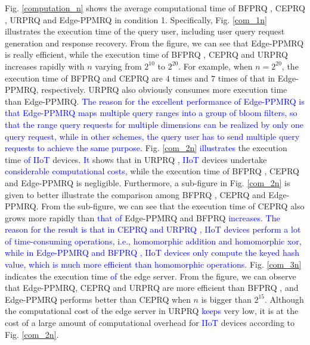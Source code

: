 \documentclass[IEEE JOURNAL OF BIOMEDICAL AND HEALTH INFORMATICS]{IEEEtran}
\begin{document}
{Fig. \ref{computation_n} shows the average computational time of BFPRQ \cite{mahdikhani2020IoT}, CEPRQ \cite{hasan2020IoT}, URPRQ \cite{mahdikhani2020using} and Edge-PPMRQ in condition 1. Specifically, Fig. \ref{com_1n} illustrates the execution time of the query user, including user query request generation and response recovery. From the figure, we can see that Edge-PPMRQ is really efficient, while the execution time of BFPRQ \cite{mahdikhani2020IoT}, CEPRQ \cite{hasan2020IoT} and URPRQ \cite{mahdikhani2020using} increases rapidly with $n$ varying from $2^{10}$ to $2^{20}$. For example, when $n=2^{20}$, the execution time of BFPRQ \cite{mahdikhani2020IoT} and CEPRQ \cite{hasan2020IoT} are $4$ times and $7$ times of that in Edge-PPMRQ, respectively. URPRQ \cite{mahdikhani2020using} also obviously consumes more execution time than Edge-PPMRQ. \textcolor{blue}{The reason for the excellent performance of Edge-PPMRQ is that Edge-PPMRQ maps multiple query ranges into a \textcolor{blue}{group of bloom filters}, so that the range query requests for multiple dimensions can be realized by only one query request, while in other schemes, the query user has to send multiple query requests to achieve the same purpose}. Fig. \ref{com_2n} \textcolor{blue}{illustrates} the execution time \textcolor{blue}{of} \textcolor{blue}{IIoT} devices. \textcolor{blue}{It} shows that in URPRQ \cite{mahdikhani2020using}, \textcolor{blue}{IIoT} devices undertake \textcolor{blue}{considerable computational costs}, while the execution time of BFPRQ \cite{mahdikhani2020IoT}, CEPRQ \cite{hasan2020IoT} and Edge-PPMRQ is negligible. Furthermore, a sub-figure in Fig. \ref{com_2n} is given to better illustrate the comparison among BFPRQ \cite{mahdikhani2020IoT}, CEPRQ \cite{hasan2020IoT} and Edge-PPMRQ. From the sub-figure, we can see that the execution time of CEPRQ \cite{hasan2020IoT} also grows more rapidly than \textcolor{blue}{that of} Edge-PPMRQ and BFPRQ \cite{mahdikhani2020IoT} \textcolor{blue}{increases}. \textcolor{blue}{The reason for the result is that in CEPRQ \cite{hasan2020IoT} and URPRQ \cite{mahdikhani2020using}, \textcolor{blue}{IIoT} devices perform a lot of time-consuming operations, i.e., homomorphic addition and homomorphic xor, while in Edge-PPMRQ and BFPRQ \cite{mahdikhani2020IoT}, \textcolor{blue}{IIoT} devices only compute the keyed hash value, which is much more efficient than homomorphic operations.} Fig. \ref{com_3n} indicates the execution time \textcolor{blue}{of} the edge server. From the figure, we can observe that Edge-PPMRQ, CEPRQ \cite{hasan2020IoT} and URPRQ \cite{mahdikhani2020using} are more efficient than BFPRQ \cite{mahdikhani2020IoT}, and  Edge-PPMRQ performs better than CEPRQ \cite{hasan2020IoT} when $n$ is bigger than $2^{15}$. Although the computational cost of the edge server in URPRQ \cite{mahdikhani2020using} \textcolor{blue}{keeps} very low, it is at the cost of a large amount of computational overhead for \textcolor{blue}{IIoT} devices  according to Fig. \ref{com_2n}.



}
\end{document}
